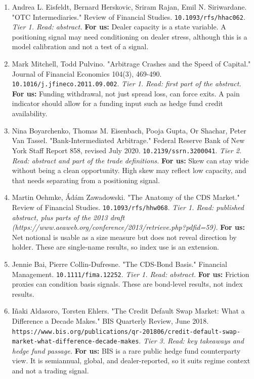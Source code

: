 \begin{enumerate}[leftmargin=*,itemsep=3pt]
\item Andrea L. Eisfeldt, Bernard Herskovic, Sriram Rajan, Emil N. Siriwardane. "OTC Intermediaries." Review of Financial Studies. \nolinkurl{10.1093/rfs/hhac062}. \emph{Tier 1. Read: abstract.} \textbf{For us:} Dealer capacity is a state variable. A positioning signal may need conditioning on dealer stress, although this is a model calibration and not a test of a signal.
\item Mark Mitchell, Todd Pulvino. "Arbitrage Crashes and the Speed of Capital." Journal of Financial Economics 104(3), 469-490. \nolinkurl{10.1016/j.jfineco.2011.09.002}. \emph{Tier 1. Read: first part of the abstract.} \textbf{For us:} Funding withdrawal, not just spread loss, can force exits. A pain indicator should allow for a funding input such as hedge fund credit availability.
\item Nina Boyarchenko, Thomas M. Eisenbach, Pooja Gupta, Or Shachar, Peter Van Tassel. "Bank-Intermediated Arbitrage." Federal Reserve Bank of New York Staff Report 858, revised July 2020. \nolinkurl{10.2139/ssrn.3200041}. \emph{Tier 2. Read: abstract and part of the trade definitions.} \textbf{For us:} Skew can stay wide without being a clean opportunity. High skew may reflect low capacity, and that needs separating from a positioning signal.
\item Martin Oehmke, Ádám Zawadowski. "The Anatomy of the CDS Market." Review of Financial Studies. \nolinkurl{10.1093/rfs/hhw068}. \emph{Tier 1. Read: published abstract, plus parts of the 2013 draft (https://www.aeaweb.org/conference/2013/retrieve.php?pdfid=59).} \textbf{For us:} Net notional is usable as a size measure but does not reveal direction by holder. These are single-name results, so index use is an extension.
\item Jennie Bai, Pierre Collin-Dufresne. "The CDS-Bond Basis." Financial Management. \nolinkurl{10.1111/fima.12252}. \emph{Tier 1. Read: abstract.} \textbf{For us:} Friction proxies can condition basis signals. These are bond-level results, not index results.
\item Iñaki Aldasoro, Torsten Ehlers. "The Credit Default Swap Market: What a Difference a Decade Makes." BIS Quarterly Review, June 2018. \nolinkurl{https://www.bis.org/publications/qr-201806/credit-default-swap-market-what-difference-decade-makes}. \emph{Tier 3. Read: key takeaways and hedge fund passage.} \textbf{For us:} BIS is a rare public hedge fund counterparty view. It is semiannual, global, and dealer-reported, so it suits regime context and not a trading signal.

\end{enumerate}
